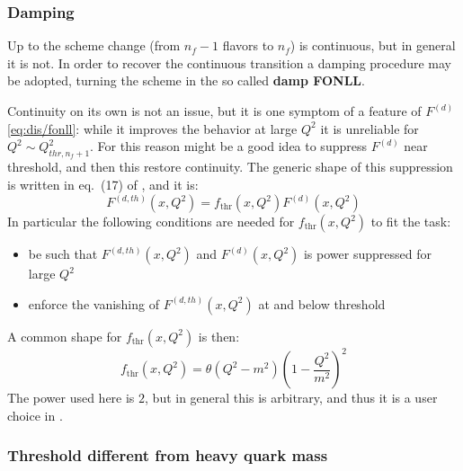 \subsubsection{Damping}
\label{sec:dis/fonll-damp}

Up to \nlo the scheme change (from $n_f - 1$ flavors to $n_f$) is continuous,
but in general it is not.
%
In order to recover the continuous transition a damping procedure may be
adopted, turning the scheme in the so called \textbf{damp FONLL}.

Continuity on its own is not an issue, but it is one symptom of a feature of
$F^{(d)}$ \cref{eq:dis/fonll}: while it improves the behavior at large $Q^2$ it
is unreliable for $Q^2 \sim Q_{thr,n_f+1}^2$.
%
For this reason might be a good idea to suppress $F^{(d)}$ near threshold, and
then this restore continuity.
%
The generic shape of this suppression is written in eq.~(17) of
\cite{Forte:2010ta}, and it is:
\begin{equation}
   F^{(d, th)} (x, Q^2) = f_{\textrm{thr}} (x, Q^2) F^{(d)}(x, Q^2)
\end{equation}
In particular the following conditions are needed for $f_{\text{thr}} (x, Q^2)$
to fit the task:
\begin{itemize}
  \item be such that $F^{(d, th)} (x, Q^2)$ and $F^{(d)} (x, Q^2)$ is
    power suppressed for large $Q^2$
  \item enforce the vanishing of $F^{(d, th)} (x, Q^2)$ at and below threshold
\end{itemize}

A common shape for $f_{\textrm{thr}} (x, Q^2)$ is then:
\begin{equation}
   f_{\textrm{thr}} (x, Q^2) = \theta(Q^2 - m^2) \left(1 -  \frac{Q^2}{m^2}\right)^2
\end{equation}
The power used here is $2$, but in general this is arbitrary, and thus it is a
user choice in \yadism.

\subsubsection{Threshold different from heavy quark mass}
\label{sec:dis/thr-neq-mass}

